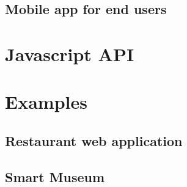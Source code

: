 \subsection{Mobile app for end users}
\label{sub:mobile_app_for_end_users}




\section{Javascript API}
\label{sec:javascript_api}

\section{Examples}
\label{sec:examples}

\subsection{Restaurant web application}
\label{sub:restaurant_web_application}

\cite{SLOC}

\subsection{Smart Museum}
\label{sub:smart_museum}
